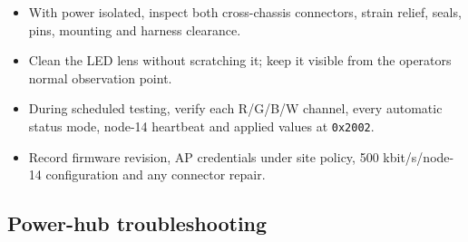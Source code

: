 \documentclass[
  10pt,
  letterpaper,
  openany]{report}
\providecommand{\tightlist}{%
  \setlength{\itemsep}{0pt}\setlength{\parskip}{0pt}}
\begin{document}
\begin{itemize}
\tightlist
\item
  With power isolated, inspect both cross-chassis connectors, strain
  relief, seals, pins, mounting and harness clearance.
\item
  Clean the LED lens without scratching it; keep it visible from the
  operator\textquotesingle s normal observation point.
\item
  During scheduled testing, verify each R/G/B/W channel, every automatic
  status mode, node-14 heartbeat and applied values at \texttt{0x2002}.
\item
  Record firmware revision, AP credentials under site policy, 500
  kbit/s/node-14 configuration and any connector repair.
\end{itemize}

\subsection{Power-hub troubleshooting}\label{power-hub-troubleshooting}
\end{document}
